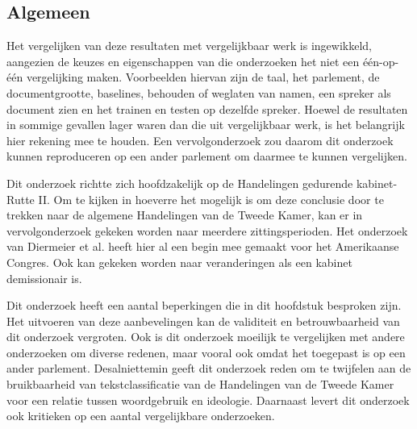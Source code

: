 \subsection{Algemeen}
Het vergelijken van deze resultaten met vergelijkbaar werk is ingewikkeld, aangezien de keuzes en eigenschappen van die onderzoeken het niet een één-op-één vergelijking maken. Voorbeelden hiervan zijn de taal, het parlement, de documentgrootte, baselines, behouden of weglaten van namen, een spreker als document zien en het trainen en testen op dezelfde spreker. Hoewel de resultaten in sommige gevallen lager waren dan die uit vergelijkbaar werk, is het belangrijk hier rekening mee te houden. Een vervolgonderzoek zou daarom dit onderzoek kunnen reproduceren op een ander parlement om daarmee te kunnen vergelijken.\par
Dit onderzoek richtte zich hoofdzakelijk op de Handelingen gedurende kabinet-Rutte II. Om te kijken in hoeverre het mogelijk is om deze conclusie door te trekken naar de algemene Handelingen van de Tweede Kamer, kan er in vervolgonderzoek gekeken worden naar meerdere zittingsperioden. Het onderzoek van Diermeier et al. \cite{diermeier_godbout_yu_kaufmann_2012} heeft hier al een begin mee gemaakt voor het Amerikaanse Congres. Ook kan gekeken worden naar veranderingen als een kabinet demissionair is.\par
Dit onderzoek heeft een aantal beperkingen die in dit hoofdstuk besproken zijn. Het uitvoeren van deze aanbevelingen kan de validiteit en betrouwbaarheid van dit onderzoek vergroten. Ook is dit onderzoek moeilijk te vergelijken met andere onderzoeken om diverse redenen, maar vooral ook omdat het toegepast is op een ander parlement. Desalniettemin geeft dit onderzoek reden om te twijfelen aan de bruikbaarheid van tekstclassificatie van de Handelingen van de Tweede Kamer voor een relatie tussen woordgebruik en ideologie. Daarnaast levert dit onderzoek ook kritieken op een aantal vergelijkbare onderzoeken.\par